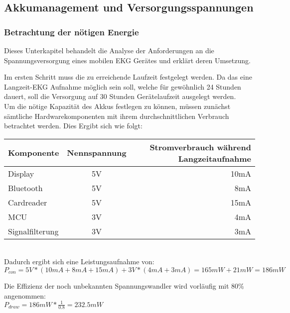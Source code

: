 

\subsection{Akkumanagement und Versorgungsspannungen}


\subsubsection{Betrachtung der nötigen Energie}

Dieses Unterkapitel behandelt die Analyse der Anforderungen an die Spannungsversorgung eines mobilen EKG Gerätes und erklärt deren Umsetzung.

Im ersten Schritt muss die zu erreichende Laufzeit festgelegt werden. Da das eine Langzeit-EKG Aufnahme möglich sein soll, welche für gewöhnlich 24 Stunden dauert, soll die Versorgung auf 30 Stunden Gerätelaufzeit ausgelegt werden. \\

Um die nötige Kapazität des Akkus festlegen zu können, müssen zunächst sämtliche Hardwarekomponenten mit ihrem durchschnittlichen Verbrauch betrachtet werden. Dies Ergibt sich wie folgt:
\\

\begin{tabular}[h]{l|c|r}
Komponente & Nennspannung & Stromverbrauch während Langzeitaufnahme\\
\hline
Display & 5V & 10mA \\
Bluetooth & 5V & 8mA \\
Cardreader & 5V & 15mA \\
MCU & 3V & 4mA \\
Signalfilterung & 3V & 3mA \\
\end{tabular}
\\
Dadurch ergibt sich eine Leistungsaufnahme von:\\
$ P_{con} = 5V * (10mA + 8mA + 15mA) + 3V * (4mA + 3mA) = 165mW + 21mW = 186mW $

Die Effizienz der noch unbekannten Spannungswandler wird vorläufig mit 80\% angenommen:\\
$P_{draw} = 186mW * \frac{1}{0.8} = 232.5mW $

